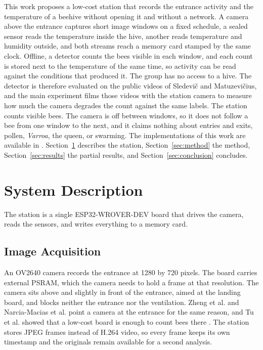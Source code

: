 \documentclass[english,hidelinks]{sbrt}
\begin{document}
This work proposes a low-cost station that records the entrance activity and the temperature of a beehive without opening it and without a network. A camera above the entrance captures short image windows on a fixed schedule, a sealed sensor reads the temperature inside the hive, another reads temperature and humidity outside, and both streams reach a memory card stamped by the same clock. Offline, a detector counts the bees visible in each window, and each count is stored next to the temperature of the same time, so activity can be read against the conditions that produced it. The group has no access to a hive. The detector is therefore evaluated on the public videos of Sledevi\v{c} and Matuzevi\v{c}ius, and the main experiment films those videos with the station camera to measure how much the camera degrades the count against the same labels. The station counts visible bees. The camera is off between windows, so it does not follow a bee from one window to the next, and it claims nothing about entries and exits, pollen, \textit{Varroa}, the queen, or swarming. The implementations of this work are available in \cite{repo}. Section~\ref{sec:system-description} describes the station, Section~\ref{sec:method} the method, Section~\ref{sec:results} the partial results, and Section~\ref{sec:conclusion} concludes.

\section{System Description}
\label{sec:system-description}

The station is a single ESP32-WROVER-DEV board that drives the camera, reads the sensors, and writes everything to a memory card.

\subsection{Image Acquisition}

An OV2640 camera records the entrance at 1280 by 720 pixels. The board carries external PSRAM, which the camera needs to hold a frame at that resolution. The camera sits above and slightly in front of the entrance, aimed at the landing board, and blocks neither the entrance nor the ventilation. Zheng et al. and Narcia-Macias et al. point a camera at the entrance for the same reason, and Tu et al. showed that a low-cost board is enough to count bees there \cite{zheng2024intelligent,narciamacias2024intellibeehive,tu2016automatic}. The station stores JPEG frames instead of H.264 video, so every frame keeps its own timestamp and the originals remain available for a second analysis.
\end{document}
